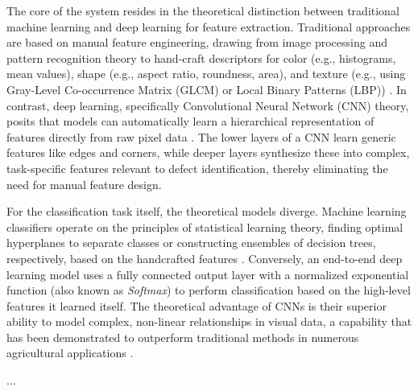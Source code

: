 {The core of the system resides in the theoretical distinction between traditional machine learning and deep learning for feature extraction. Traditional approaches are based on manual feature engineering, drawing from image processing and pattern recognition theory to hand-craft descriptors for color (e.g., histograms, mean values), shape (e.g., aspect ratio, roundness, area), and texture (e.g., using Gray-Level Co-occurrence Matrix (GLCM) or Local Binary Patterns (LBP)) \citep{haralick2007textural,ojala2002multiresolution}. In contrast, deep learning, specifically Convolutional Neural Network (CNN) theory, posits that models can automatically learn a hierarchical representation of features directly from raw pixel data \citep{lecun2015deep,goodfellow2016deep}. The lower layers of a CNN learn generic features like edges and corners, while deeper layers synthesize these into complex, task-specific features relevant to defect identification, thereby eliminating the need for manual feature design.

For the classification task itself, the theoretical models diverge. Machine learning classifiers operate on the principles of statistical learning theory, finding optimal hyperplanes to separate classes or constructing ensembles of decision trees, respectively, based on the handcrafted features \citep{hearst1998support,breiman2001random}. Conversely, an end-to-end deep learning model uses a fully connected output layer with a normalized exponential function (also known as \textit{Softmax}) to perform classification based on the high-level features it learned itself. The theoretical advantage of CNNs is their superior ability to model complex, non-linear relationships in visual data, a capability that has been demonstrated to outperform traditional methods in numerous agricultural applications \citep{bharman2022deep}.

...
}